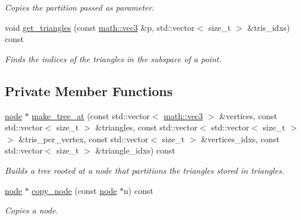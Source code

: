 \begin{DoxyCompactItemize}
\begin{DoxyCompactList}\small\item\em Copies the partition passed as parameter. \end{DoxyCompactList}\item 
void \hyperlink{classphysim_1_1structures_1_1object__partition_a9842318da10d96079d00fe53debd9398}{get\+\_\+triangles} (const \hyperlink{structphysim_1_1math_1_1vec3}{math\+::vec3} \&p, std\+::vector$<$ size\+\_\+t $>$ \&tris\+\_\+idxs) const
\begin{DoxyCompactList}\small\item\em Finds the indices of the triangles in the subspace of a point. \end{DoxyCompactList}\end{DoxyCompactItemize}
\subsection*{Private Member Functions}
\begin{DoxyCompactItemize}
\item 
\hyperlink{structphysim_1_1structures_1_1object__partition_1_1node}{node} $\ast$ \hyperlink{classphysim_1_1structures_1_1object__partition_ad69ce29b93aa13415421c1d7bb303e71}{make\+\_\+tree\+\_\+at} (const std\+::vector$<$ \hyperlink{structphysim_1_1math_1_1vec3}{math\+::vec3} $>$ \&vertices, const std\+::vector$<$ size\+\_\+t $>$ \&triangles, const std\+::vector$<$ std\+::vector$<$ size\+\_\+t $>$ $>$ \&tris\+\_\+per\+\_\+vertex, const std\+::vector$<$ size\+\_\+t $>$ \&vertices\+\_\+idxs, const std\+::vector$<$ size\+\_\+t $>$ \&triangle\+\_\+idxs) const
\begin{DoxyCompactList}\small\item\em Builds a tree rooted at a node that partitions the triangles stored in {\itshape triangles}. \end{DoxyCompactList}\item 
\hyperlink{structphysim_1_1structures_1_1object__partition_1_1node}{node} $\ast$ \hyperlink{classphysim_1_1structures_1_1object__partition_a3ffb4d83ee3be148c31a85e0603d7be7}{copy\+\_\+node} (const \hyperlink{structphysim_1_1structures_1_1object__partition_1_1node}{node} $\ast$n) const
\begin{DoxyCompactList}\small\item\em Copies a node. \end{DoxyCompactList}\end{DoxyCompactItemize}
